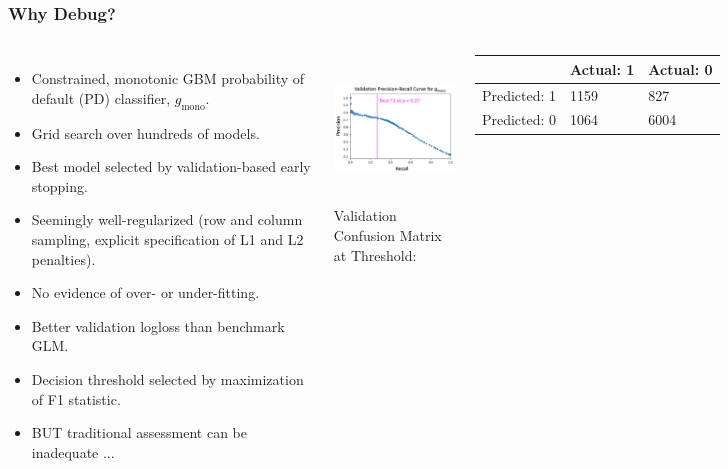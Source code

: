 \documentclass[11pt,
               aspectratio=43,
               hyperref={colorlinks}
               ]{beamer}
\begin{document}
			\begin{frame}

					\frametitle{Why Debug?}

					\begin{columns}
						
						\centering
						\begin{itemize}
							\item \scriptsize Constrained, monotonic GBM probability of default (PD) classifier, $g_{\text{mono}}$.
							\item Grid search over hundreds of models. 
							\item Best model selected by validation-based early stopping.
							\item Seemingly well-regularized (row and column sampling, explicit specification of L1 and L2 penalties).
							\item No evidence of over- or under-fitting.
							\item Better validation logloss than benchmark GLM.
							\item Decision threshold selected by maximization of F1 statistic.
							\item BUT traditional assessment can be inadequate ... 
						\end{itemize}\normalsize
						
						\vspace{20pt}
							\centering
							\includegraphics[height=110pt]{img/pr_auc.png}\\
							\tiny
							\vspace{5pt}
							Validation Confusion Matrix at Threshold:\vspace{-7pt}
							\begin{table}
								\hspace{7pt}
								\begin{tabular}{ | p{1.3cm} | p{1cm} | p{1.3cm} | }
									\hline
								 	& Actual: 1 & Actual: 0 \\ 
									\hline
									Predicted: 1 & 1159	& 827 \\
									\hline
									Predicted: 0 & 1064	& 6004 \\
									\hline
								\end{tabular}	
							\end{table}	
						\normalsize
				
					\end{columns}
							
			\end{frame}
\end{document}
